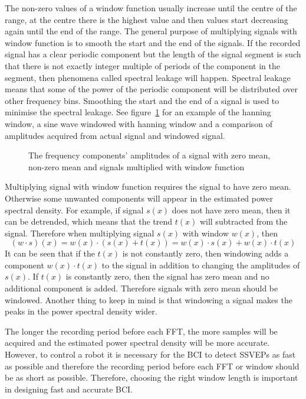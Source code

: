 The non-zero values of a window function usually increase until the centre of the range, at the centre there is the highest value and then values start decreasing again until the end of the range. The general purpose of multiplying signals with window function is to smooth the start and the end of the signals. If the recorded signal has a clear periodic component but the length of the signal segment is such that there is not exactly integer multiple of periods of the component in the segment, then phenomena called spectral leakage will happen. Spectral leakage means that some of the power of the periodic component will be distributed over other \glspl{frequency bin}. Smoothing the start and the end of a signal is used to minimise the spectral leakage. See figure~\ref{fig:window} for an example of the hanning window, a sine wave windowed with hanning window and a comparison of amplitudes acquired from actual signal and windowed signal.

\begin{figure}[h!]
	
	\caption{The frequency components' amplitudes of a signal with zero mean, non-zero mean and signals multiplied with window function}
	\label{fig:window}
\end{figure}

Multiplying signal with window function requires the signal to have zero mean. Otherwise some unwanted components will appear in the estimated \gls{power spectral density}. For example, if signal $s(x)$ does not have zero mean, then it can be detrended, which means that the trend $t(x)$ will subtracted from the signal. Therefore when multiplying signal $s(x)$ with window $w(x)$, then
\begin{equation}
	(w\cdot s)(x) = w(x)\cdot(s(x)+t(x))=w(x)\cdot s(x)+w(x)\cdot t(x)
\end{equation}
It can be seen that if the $t(x)$ is not constantly zero, then windowing adds a component $w(x)\cdot t(x)$ to the signal in addition to changing the amplitudes of $s(x)$. If $t(x)$ is constantly zero, then the signal has zero mean and no additional component is added. Therefore signals with zero mean should be windowed. Another thing to keep in mind is that windowing a signal makes the peaks in the \gls{power spectral density} wider.

The longer the recording period before each \gls{FFT}, the more samples will be acquired and the estimated \gls{power spectral density} will be more accurate. However, to control a robot it is necessary for the \gls{BCI} to detect \glspl{SSVEP} as fast as possible and therefore the recording period before each \gls{FFT} or window should be as short as possible. Therefore, choosing the right window length is important in designing fast and accurate \gls{BCI}.

